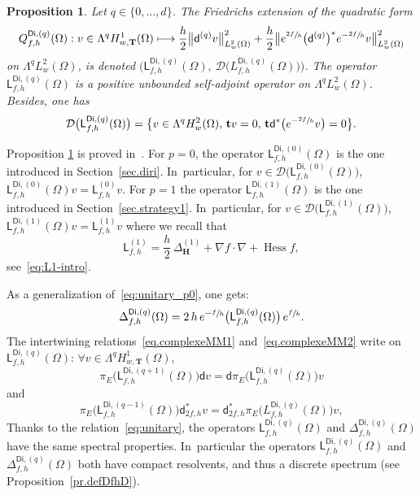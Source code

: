 \documentclass[10pt]{amsart}
\newcommand\mto{\mathchoice{\longmapsto}{\mapsto}{\mapsto}{\mapsto}}
\newcommand{\mbf}[1]{\mathbf{#1}}
\DeclareMathOperator{\hess}{Hess}\let\Hess\hess
\theoremstyle{plain}
\newtheorem{proposition}{Proposition}
\theoremstyle{definition}
\begin{document}
\begin{proposition} \label{Lp}
Let $q\in \{0,\ldots,d\}$.
The Friedrichs extension of the quadratic form
\[
Q_{f,h}^{\mathsf{Di},(q)}(\Omega): v \in \Lambda^q H^1_{w,\mbf T}(\Omega)\mto \frac{h}{2}
\big\Vert \mathsf d^{(q)}v\big \Vert_{ L^2_w(\Omega)}^2
+\frac{h}{2}\big \Vert
e^{\sfrac{2f}{h}} \bigl(\mathsf d^{(q)}\bigr)^* e^{-\sfrac{2f}{h}} v\big \Vert_{ L^2_w(\Omega)}^2
\]
on $\Lambda^qL^2_w(\Omega)$, is denoted
$\bigl(\mathsf L^{\mathsf{Di},(q)}_{f,h}(\Omega), \ \mathcal
D\bigl(L^{\mathsf{Di},(q)}_{f,h}(\Omega)\bigr)\bigr)$. The operator $\mathsf L^{\mathsf{Di},(q)}_{f,h}(\Omega)$ is a positive unbounded self-adjoint operator on $\Lambda^qL^2_w(\Omega)$. Besides, one has
\[
\mathcal D\bigl(\mathsf L^{\mathsf{Di},(q)}_{f,h}(\Omega)\bigr)=\big\{ v \in \Lambda^qH^2_w(\Omega),\, \mbf tv=0, \, \mbf t \mathsf d^*\bigl(e^{-\sfrac{2f}{h}}v\bigr)=0 \big\}.
\]
\end{proposition}

Proposition \ref{Lp} is proved in~\cite[\S2.4]{helffer-nier-06}.
For $p=0$, the operator $\mathsf L^{\mathsf{Di},(0)}_{f,h}(\Omega)$
is the one introduced in Section~\ref{sec.diri}. In~particular,
for $v\in \mathcal D\bigl(\mathsf L^{\mathsf{Di},(0)}_{f,h}(\Omega)\bigr)$,
$\mathsf L_{f,h}^{\mathsf{Di}, (0)}(\Omega)v = \mathsf L_{f,h}^{ (0)}v$.
For $p=1$ the operator $\mathsf L^{\mathsf{Di},(1)}_{f,h}(\Omega)$ is the one introduced in Section~\ref{sec.strategy1}. In~particular,
for $v\in \mathcal D\bigl(\mathsf L^{\mathsf{Di},(1)}_{f,h}(\Omega)\bigr)$,
$\mathsf L_{f,h}^{\mathsf{Di}, (1)} (\Omega)v = \mathsf L_{f,h}^{(1)} v$
where we recall that
\[
\mathsf L_{f,h}^{(1)} = \frac{h}{2}\,
\Delta^{(1)}_{\mbf H} + \nabla f \cdot \nabla + \hess f,
\]
see~\eqref{eq:L1-intro}.

As a generalization of~\eqref{eq:unitary_p0}, one gets:
\begin{equation}\label{eq:unitary}
\Delta^{\mathsf{Di},(q)}_{f,h}(\Omega) = 2\, h \, e^{-\sfrac{f}{h}} \bigl(\mathsf L^{\mathsf{Di},(q)}_{f,h}(\Omega) \bigr)\, e^{\sfrac{f}{h}}.
\end{equation}
The intertwining relations~\eqref{eq.complexeMM1} and~\eqref{eq.complexeMM2}
write on $\mathsf L_{f,h}^{\mathsf{Di},(q)}(\Omega)$: $\forall v\in \Lambda^q H^1_{w,\mbf T}(\Omega)$,
\begin{equation}\label{commutationL}
\pi_{E}\bigl(\mathsf L_{f,h}^{\mathsf{Di},(q+1)}(\Omega))\mathsf dv =\mathsf d \pi_{E}\bigl(\mathsf L_{f,h}^{\mathsf{Di},(q)}(\Omega))v
\end{equation}
and
\begin{equation}\label{commutationL2}
\pi_{E}\bigl(\mathsf L_{f,h}^{\mathsf{Di},(q-1)}(\Omega) \bigr)\mathsf d_{2f,h}^{*} v= \mathsf d^{*}_{2f,h} \pi_{E}\bigl(L_{f,h}^{\mathsf{Di},(q)}(\Omega)\bigr)v,
\end{equation}
Thanks to the relation~\eqref{eq:unitary}, the operators
$\mathsf L_{f,h}^{\mathsf{Di},(q)}(\Omega)$ and $\Delta^{\mathsf{Di},(q)}_{f,h}(\Omega)$ have the
same spectral properties. In~particular the operators
$\mathsf L_{f,h}^{\mathsf{Di},(q)}(\Omega)$ and $\Delta^{\mathsf{Di},(q)}_{f,h}(\Omega)$ both have
compact resolvents, and thus a discrete spectrum (see Proposition~\ref{pr.defDfhD}).
\end{document}
